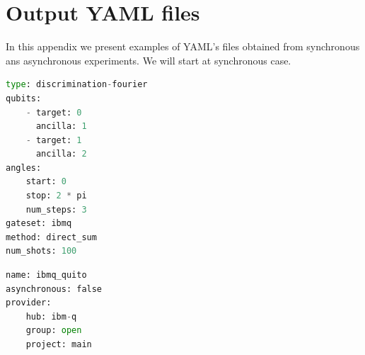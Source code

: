 \documentclass[preprint,12pt, a4paper, dvipsnames]{elsarticle}
\newcommand{\1}{{\rm 1\hspace{-0.9mm}l}}
\theoremstyle{definition}
\begin{document}
\section{Output YAML files} \label{app:example}
In this appendix we present examples of YAML's files obtained from synchronous ans asynchronous experiments. We will start at synchronous case.

\begin{lstlisting}[language=Python, caption=Defining experiment file]
type: discrimination-fourier
qubits:
	- target: 0
	  ancilla: 1
	- target: 1
	  ancilla: 2
angles:
	start: 0
	stop: 2 * pi
	num_steps: 3
gateset: ibmq
method: direct_sum
num_shots: 100
\end{lstlisting}

\begin{lstlisting}[language=Python, caption=Defining backend file]
name: ibmq_quito
asynchronous: false
provider:
	hub: ibm-q
	group: open
	project: main

\end{lstlisting}
\end{document}
